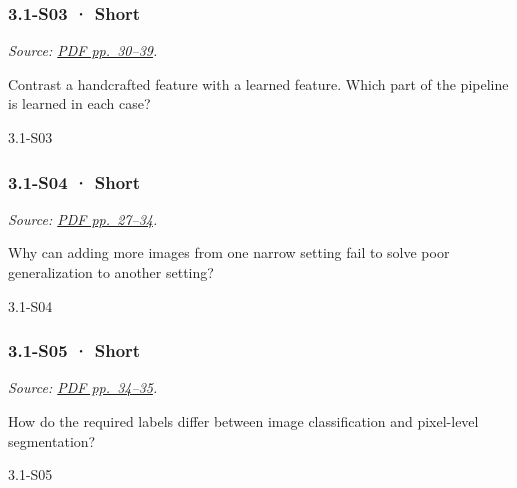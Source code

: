 \noindent\begin{minipage}{\linewidth}

\subsubsection{3.1-S03 · Short}\label{s03-short-7}

\emph{Source:
\href{../Lecture\%20Slides/3.1.\%20Introduction\%20to\%20Deep\%20Learning.pdf\#page=30}{PDF
pp.~30--39}.}

Contrast a handcrafted feature with a learned feature. Which part of the
pipeline is learned in each case?

\begin{solution}[20mm]{3.1-S03}

\end{solution}
\end{minipage}\par\medskip

\noindent\begin{minipage}{\linewidth}

\subsubsection{3.1-S04 · Short}\label{s04-short-7}

\emph{Source:
\href{../Lecture\%20Slides/3.1.\%20Introduction\%20to\%20Deep\%20Learning.pdf\#page=27}{PDF
pp.~27--34}.}

Why can adding more images from one narrow setting fail to solve poor
generalization to another setting?

\begin{solution}[20mm]{3.1-S04}

\end{solution}
\end{minipage}\par\medskip

\noindent\begin{minipage}{\linewidth}

\subsubsection{3.1-S05 · Short}\label{s05-short-7}

\emph{Source:
\href{../Lecture\%20Slides/3.1.\%20Introduction\%20to\%20Deep\%20Learning.pdf\#page=34}{PDF
pp.~34--35}.}

How do the required labels differ between image classification and
pixel-level segmentation?

\begin{solution}[20mm]{3.1-S05}

\end{solution}
\end{minipage}\par\medskip

